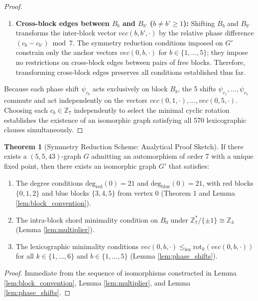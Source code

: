 \documentclass[11pt,a4paper]{article}
\theoremstyle{definition}
\newtheorem{theorem}{Theorem}
\begin{document}
\begin{proof}
\begin{enumerate}
    \item \textbf{Cross-block edges between $B_b$ and $B_{b'}$ ($b \ne b' \ge 1$):} Shifting $B_b$ and $B_{b'}$ transforms the inter-block vector $vec(b, b', \cdot)$ by the relative phase difference $(c_b - c_{b'}) \bmod 7$. The symmetry reduction conditions imposed on $G'$ constrain only the anchor vectors $vec(0, b, \cdot)$ for $b \in \{1,\dots,5\}$; they impose no restrictions on cross-block edges between pairs of free blocks. Therefore, transforming cross-block edges preserves all conditions established thus far.
\end{enumerate}
Because each phase shift $\psi_{c_b}$ acts exclusively on block $B_b$, the 5 shifts $\psi_{c_1}, \dots, \psi_{c_5}$ commute and act independently on the vectors $vec(0, 1, \cdot), \dots, vec(0, 5, \cdot)$. Choosing each $c_b \in \mathbb{Z}_7$ independently to select the minimal cyclic rotation establishes the existence of an isomorphic graph satisfying all 570 lexicographic clauses simultaneously.
\end{proof}

\begin{theorem}[Symmetry Reduction Scheme: Analytical Proof Sketch]
\label{thm:soundness}
If there exists a $(5,5,43)$-graph $G$ admitting an automorphism of order 7 with a unique fixed point, then there exists an isomorphic graph $G'$ that satisfies:
\begin{enumerate}
    \item The degree conditions $\text{deg}_{\text{red}}(0) = 21$ and $\text{deg}_{\text{blue}}(0) = 21$, with red blocks $\{0,1,2\}$ and blue blocks $\{3,4,5\}$ from vertex 0 (Theorem 1 and Lemma \ref{lem:block_convention}).
    \item The intra-block chord minimality condition on $B_0$ under $\mathbb{Z}_7^* / \{\pm 1\} \cong \mathbb{Z}_3$ (Lemma \ref{lem:multiplier}).
    \item The lexicographic minimality conditions $vec(0, b, \cdot) \le_{\text{lex}} \text{rot}_k(vec(0, b, \cdot))$ for all $k \in \{1,\dots,6\}$ and $b \in \{1,\dots,5\}$ (Lemma \ref{lem:phase_shifts}).
\end{enumerate}
\end{theorem}
\begin{proof}
Immediate from the sequence of isomorphisms constructed in Lemma \ref{lem:block_convention}, Lemma \ref{lem:multiplier}, and Lemma \ref{lem:phase_shifts}.
\end{proof}
\end{document}
